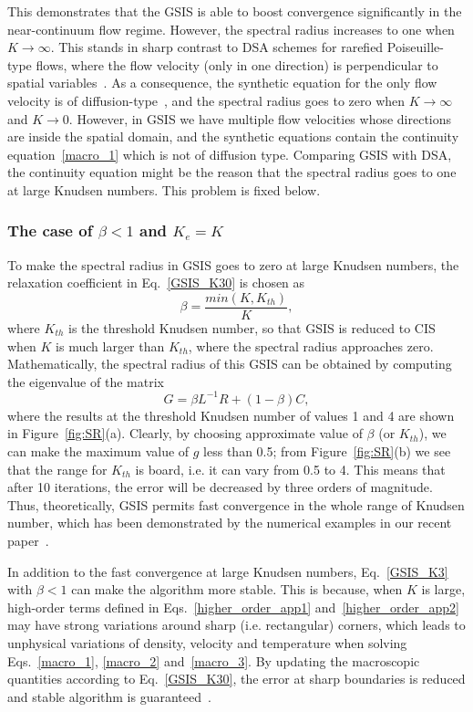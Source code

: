 This demonstrates that the GSIS is able to boost convergence significantly in the near-continuum flow regime. However, the spectral radius increases to one when $K\rightarrow\infty$. This stands in sharp contrast to DSA schemes for rarefied Poiseuille-type flows, where the flow velocity (only in one direction) is perpendicular to spatial variables~\cite{Valougeorgis:2003zr}. As a consequence, the synthetic equation for the only flow velocity is of diffusion-type~\cite{Valougeorgis:2003zr,LeiJCP2017,SU2019573}, and the spectral radius goes to zero when $K\rightarrow\infty$ and $K\rightarrow0$. However, in GSIS we have multiple flow velocities whose directions are inside the spatial domain, and the synthetic equations contain the continuity equation~\eqref{macro_1} which is not of diffusion type. Comparing GSIS with DSA, the continuity equation  might be  the reason that the spectral radius goes to one at large Knudsen numbers. This problem is fixed below.


\subsubsection{The case of $\beta<1$ and $K_e=K$} To make the spectral radius in GSIS goes to zero at large Knudsen numbers, the relaxation coefficient in Eq.~\eqref{GSIS_K30} is chosen as
\begin{equation}\label{GSIS_K3}
\beta=\frac{min(K,K_{th})}{K},
\end{equation}
where $K_{th}$ is the threshold Knudsen number, so that GSIS is reduced to CIS when $K$ is much larger than $K_{th}$, where the spectral radius approaches zero. Mathematically, the spectral radius of this GSIS can be obtained by computing the eigenvalue of the matrix
\begin{equation}
G=\beta{L^{-1}R}+(1-\beta)C,
\end{equation} 
where the results at the threshold Knudsen number of values 1 and 4 are shown in Figure~\ref{fig:SR}(a). Clearly, by choosing approximate value of $\beta$ (or $K_{th}$), we can make the maximum value of ${g}$ less than 0.5; from Figure~\ref{fig:SR}(b) we see that the range for $K_{th}$ is board, i.e. it can vary from 0.5 to 4. This means that after 10 iterations, the error will be decreased by three orders of magnitude. Thus, theoretically, GSIS permits fast convergence in the whole range of Knudsen number, which has been demonstrated by the numerical examples in our recent paper~\cite{SuArXiv2019}.


In addition to the fast convergence at large Knudsen numbers, Eq.~\eqref{GSIS_K3} with $\beta<1$ can make the algorithm more stable. This is because, when $K$ is large, high-order terms defined in Eqs.~\eqref{higher_order_app1} and~\eqref{higher_order_app2} may have strong variations around sharp (i.e. rectangular) corners, which leads to unphysical variations of density, velocity and temperature when solving Eqs.~\eqref{macro_1}, \eqref{macro_2} and~\eqref{macro_3}. By updating the macroscopic quantities according to Eq.~\eqref{GSIS_K30}, the error at sharp boundaries is reduced and stable algorithm is guaranteed~\cite{SuArXiv2019}. 


